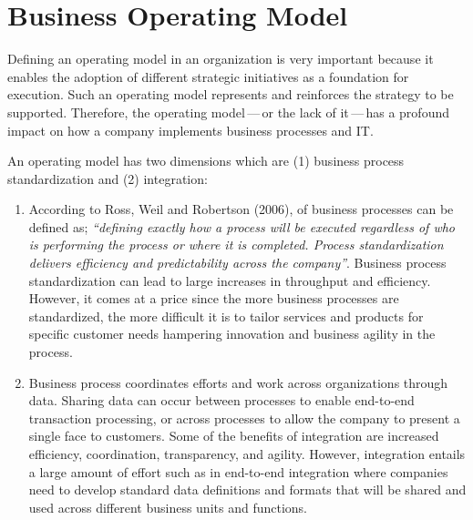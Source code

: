 \chapter{Business Operating Model}
\label{ch:operating-model}


Defining an operating model in an organization is very important because it enables the
adoption of different strategic initiatives as a foundation for execution.
Such an operating model represents and reinforces the strategy to be supported.
Therefore, the operating model\,---\,or the lack of it\,---\,has a profound impact on how a company
implements business processes and IT.

An operating model has two dimensions which are (1) business process standardization and (2) integration:

\begin{enumerate}
    \item According to Ross, Weil and Robertson (2006),  of business processes can be defined as;
          \textit{“defining exactly how a process will be executed regardless of who is performing the process or
          where it is completed.
          Process standardization delivers efficiency and predictability across the company”}.
          Business process standardization can lead to large increases in throughput and efficiency.
          However, it comes at a price since the more business processes are standardized,
          the more difficult it is to tailor services and products for specific customer needs hampering
          innovation and business agility in the process.
    \item Business process  coordinates efforts and work across organizations through data.
          Sharing data can occur between processes to enable end-to-end transaction processing,
          or across processes to allow the company to present a single face to customers.
          Some of the benefits of integration are increased efficiency, coordination, transparency, and agility.
          However, integration entails a large amount of effort such as in end-to-end integration where companies
          need to develop standard data definitions and formats that will be shared and used across different
          business units and functions.
\end{enumerate}

